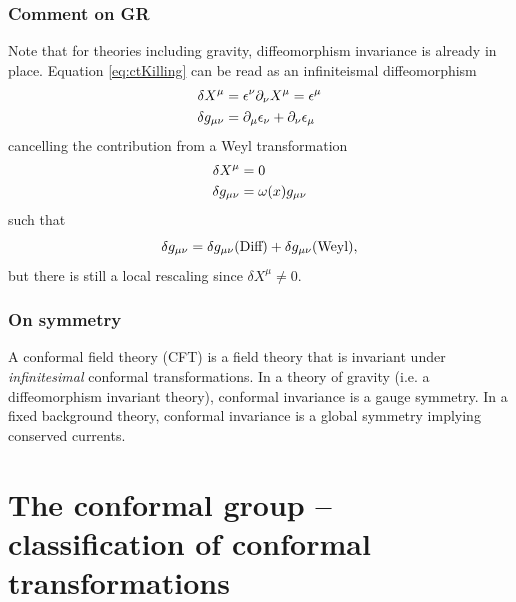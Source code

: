 \subsubsection{Comment on GR }
Note that for theories including gravity, diffeomorphism invariance is already in place. Equation \ref{eq:ctKilling} can be read as an infiniteismal diffeomorphism
\begin{align}
	\delta X^\mu &= \epsilon^\nu \partial_\nu X^\mu = \epsilon^\mu \\
	\delta g_{\mu \nu} &= \partial_\mu \epsilon_\nu + \partial_\nu \epsilon_\mu
\end{align}
cancelling the contribution from a Weyl transformation
\begin{align}
	\delta X^\mu &=0 \\
	\delta g_{\mu \nu} &= \omega(x) g_{\mu \nu} 
\end{align}
such that 
\begin{equation*}
	\delta g_{\mu \nu} = \delta g_{\mu \nu}(\text{Diff}) + \delta g_{\mu \nu}(\text{Weyl}),
\end{equation*}
but there is still a local rescaling since $\delta X^\mu \neq 0$.

\subsubsection{On symmetry}
A conformal field theory (CFT) is a field theory that is invariant under \emph{infinitesimal} conformal transformations. In a theory of gravity (i.e. a diffeomorphism invariant theory), conformal invariance is a gauge symmetry. In a fixed background theory, conformal invariance is a global symmetry implying conserved currents.







\section{The conformal group -- classification of conformal transformations}

